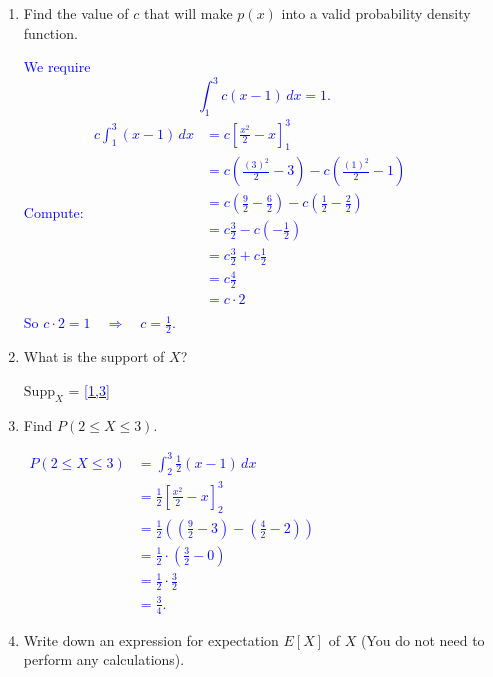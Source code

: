 \documentclass[11pt]{article}
\begin{document}
\begin{enumerate}
\begin{enumerate}[i]
\item Find the value of $c$ that will make $p(x)$ into a valid probability density function.

\vspace{0.3cm}
{\tiny
\textcolor{blue}{
We require
\[
\int_{1}^{3} c(x-1)\,dx = 1.
\]
Compute:
\(\begin{aligned}
c\int_{1}^{3} (x-1)\,dx &= c\left[\frac{x^2}{2} - x\right]_{1}^{3}\\
&= c\left(\frac{(3)^2}{2}  - 3\right) -  c\left(\frac{(1)^2}{2}  - 1\right)\\
&= c\left(\frac{9}{2} - \frac{6}{2}\right) - c\left(\frac{1}{2} - \frac{2}{2}\right)\\
&= c\frac{3}{2} - c\left(- \frac{1}{2} \right)\\
& = c\frac{3}{2} + c\frac{1}{2}\\
& = c\frac{4}{2}\\
& = c\cdot 2\\
\end{aligned}\)\\
So
\(
c \cdot 2 = 1 \quad \Rightarrow \quad c = \frac{1}{2}.
\)
}
}
\vspace{0.8cm}

\item What is the support of $X$?

\bigskip

$\mathrm{Supp}_{X}$ = \underline{\textcolor{blue}{[1,3]}}

\bigskip

\item Find $P(2 \le X \le 3)$.

{\tiny
\textcolor{blue}{
\(\begin{aligned}
P(2 \le X \le 3) &= \int_{2}^{3} \frac{1}{2}(x-1)\,dx\\
&= \frac{1}{2}\left[\frac{x^2}{2} - x\right]_{2}^{3}\\
&= \frac{1}{2}\left(\left(\frac{9}{2} - 3\right) - \left(\frac{4}{2} - 2\right)\right)\\
&= \frac{1}{2}\cdot \left(\frac{3}{2} - 0\right)\\
&= \frac{1}{2}\cdot\frac{3}{2}\\
&= \frac{3}{4}.
\end{aligned}\)
}
}
\quad
\item Write down an expression for expectation $E[X]$ of $X$ (You do not need to perform any calculations).


\end{enumerate}
\end{enumerate}
\end{document}
